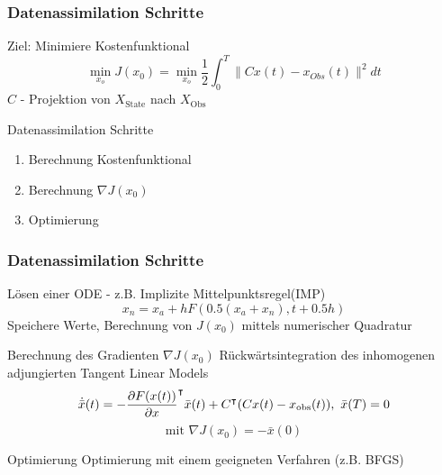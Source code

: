 \begin{frame}[<+->]
  \frametitle{Datenassimilation Schritte}
	\begin{block}{Ziel: Minimiere Kostenfunktional}
	\begin{equation}\label{eq:costFunctional}
		\min_{x_o} J(x_0) = \min_{x_o} \frac{1}{2}\int_0^T \|Cx(t) - x_{Obs}(t)\|^2dt
	\end{equation}
	  $C$ - Projektion von $X_{\text{State}}$ nach $X_{\text{Obs}}$ 
	\end{block}
	\begin{block}{Datenassimilation Schritte}
	\begin{enumerate}
	 \item Berechnung Kostenfunktional
	 \item Berechnung $\nabla J(x_0)$
	 \item Optimierung
	\end{enumerate}
	\end{block}
\end{frame}
 
\begin{frame}[<+->]
  \frametitle{Datenassimilation Schritte}
  \begin{block}{Lösen einer ODE - z.B. Implizite Mittelpunktsregel(IMP)}
	\begin{equation}
	 x_n = x_a + h F \left(0.5 (x_a + x_n), t + 0.5 h\right)
	\end{equation}
	Speichere Werte, Berechnung von $J(x_0)$ mittels numerischer Quadratur
  \end{block}
  \begin{block}{Berechnung des Gradienten $\nabla J(x_0)$}
	Rückwärtsintegration des inhomogenen adjungierten Tangent Linear Models
	\begin{equation}
	  \dot{ \bar{x}}(t) =  -\frac{\partial F(x(t))}{\partial x}^\intercal \bar x(t) +C^\intercal(Cx(t) - x_{\text{obs}}(t)), ~ \bar x(T) =0
	\end{equation}
	\[
	\text{mit }\nabla J(x_0) = -\bar x(0)
	\]
  \end{block}
  \begin{block}{Optimierung}
	Optimierung mit einem geeigneten Verfahren (z.B. BFGS)
  \end{block}

\end{frame} 